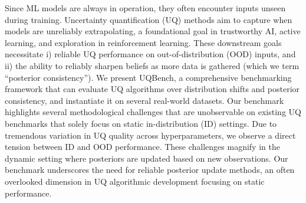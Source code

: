 Since ML models are always in operation, they often encounter inputs unseen during training. Uncertainty quantification (UQ) methods aim to capture when models are unreliably extrapolating, a foundational goal in trustworthy AI, active learning, and exploration in reinforcement learning. These downstream goals necessitate  i) reliable UQ performance on out-of-distribution (OOD) inputs, and ii) the ability to reliably sharpen beliefs as more data is gathered (which we term “posterior consistency”). We present \textsf{UQBench}, a comprehensive benchmarking framework that can evaluate UQ algorithms over distribution shifts and posterior consistency, and instantiate it on several real-world datasets. Our benchmark highlights several methodological challenges that are unobservable on existing UQ benchmarks that solely focus on static in-distribution (ID) settings. Due to tremendous variation in UQ quality across hyperparameters, we observe a direct tension between ID and OOD performance. These challenges magnify in the dynamic setting where posteriors are updated based on new observations. Our benchmark underscores the need for reliable posterior update methods, an often overlooked dimension in UQ algorithmic development focusing on static performance. 

